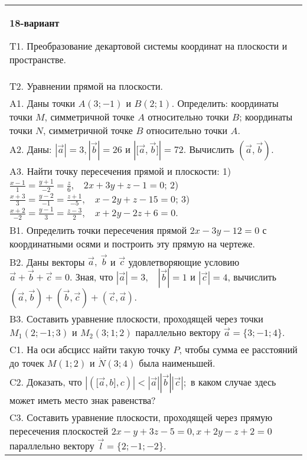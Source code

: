 \documentclass{article}
\begin{document}
\begin{tabular}{m{17cm}}
\textbf{18-вариант}
\newline

T1. 
Преобразование декартовой системы координат на плоскости и пространстве. \\
T2. Уравнении прямой на плоскости.
 \\
A1. 
Даны точки \(A(3; - 1)\) и \(B(2;1)\). Определить: координаты точки \(M\), симметричной точке \(A\) относительно точки \(B\); координаты точки \(N\), симметричной точке \(B\) относительно точки \(A\).
 \\
A2. 
Даны: \(|\overrightarrow{a}| = 3,|\overrightarrow{b}| = 26\) и \(|\lbrack\overrightarrow{a},\overrightarrow{b}\rbrack| = 72\). Вычислить \(\left( \overrightarrow{a},\overrightarrow{b} \right)\).
 \\
A3. 
Найти точку пересечения прямой и плоскости: 1) \(\frac{x - 1}{1} = \frac{y + 1}{- 2} = \frac{z}{6},\ \ \ \ 2x + 3y + z - 1 = 0\); 2) \(\frac{x + 3}{3} = \frac{y - 2}{- 1} = \frac{z + 1}{- 5},\ \ \ \ x - 2y + z - 15 = 0\); 3) \(\frac{x + 2}{- 2} = \frac{y - 1}{3} = \frac{z - 3}{2},\ \ \ \ x + 2y - 2z + 6 = 0\).
 \\
B1. 
Определить точки пересечения прямой \(2x - 3y - 12 = 0\) с координатными осями и построить эту прямую на чертеже.
 \\
B2. 
Даны векторы \(\overrightarrow{a},\ \overrightarrow{b}\) и \(\overrightarrow{c}\) удовлетворяющие условию \(\overrightarrow{a} + \overrightarrow{b} + \overrightarrow{c} = 0\). Зная, что \(|\overrightarrow{a}| = 3,\ \ \ \ |\overrightarrow{b}| = 1\) и \(|\overrightarrow{c}| = 4\), вычислить \(\left( \overrightarrow{a},\overrightarrow{b} \right) + \left( \overrightarrow{b},\overrightarrow{c} \right) + \left( \overrightarrow{c},\overrightarrow{a} \right)\).
 \\
B3. 
Составить уравнение плоскости, проходящей через точки \(M_{1}(2; - 1;3)\) и \(M_{2}(3;1;2)\) параллельно вектору \(\overrightarrow{a} = \{ 3; - 1;4\}\).
 \\
C1. 
На оси абсцисс найти такую точку \(P\), чтобы сумма ее расстояний до точек \(M(1;2)\) и \(\dot{N}(3;4)\) была наименьшей.
 \\
C2. 
Доказать, что \(|(\lbrack\overrightarrow{a},b\rbrack,c)| <  |\overrightarrow{a}||\overrightarrow{b}||\overrightarrow{c}|;\) в каком случае здесь может иметь место знак равенства?
 \\
C3. Составить уравнение плоскости, проходящей через прямую пересечения плоскостей \(2x - y + 3z - 5 = 0,x + 2y - z + 2 = 0\) параллельно вектору \(\overrightarrow{l} = \{ 2; - 1; - 2\}\).
 \\

\end{tabular}
\vspace{1cm}
\end{document}
